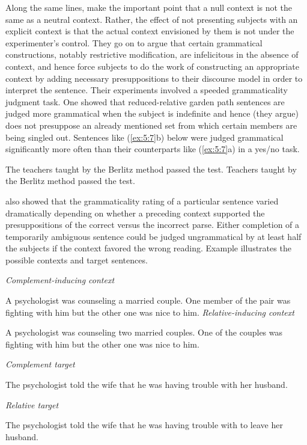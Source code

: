 Along the same lines, \citet{CrainSteedman1985} make the important point that a null context is not the same as a neutral context. Rather, the effect of not presenting subjects with an explicit context is that the actual context envisioned by them is not under the experimenter's control. They go on to argue that certain grammatical constructions, notably restrictive modification, are infelicitous in the
absence of context, and hence force subjects to do the work of constructing an appropriate context by adding necessary presuppositions to their discourse model in order to interpret the sentence. Their experiments involved a speeded grammaticality judgment task. One showed that reduced-relative garden path sentences are judged more grammatical when the subject is indefinite and hence (they argue) does not presuppose an already mentioned set from which certain members are being singled out. Sentences like (\ref{ex:5:7}b) below were judged grammatical significantly more often than their counterparts like (\ref{ex:5:7}a) in a yes/no task.

\ea\label{ex:5:7}
\ea The teachers taught by the Berlitz method passed the test.
\ex  Teachers taught by the Berlitz method passed the test.
\z
\z

\noindent
\citeauthor{CrainSteedman1985} also showed that the grammaticality rating of a particular sentence varied dramatically depending on whether a preceding context supported the presuppositions of the correct versus the incorrect parse. Either completion of a temporarily ambiguous sentence could be judged ungrammatical by at least half the subjects if the context favored the wrong reading. Example  illustrates the possible contexts and target sentences.

\ea\label{ex:5:8}
\ea       \textit{Complement-inducing  context}

A psychologist was counseling a married couple. One member of the pair was fighting with him but the other one was nice to him.
\ex  \textit{Relative-inducing  context}

A psychologist was counseling two married couples. One of the couples was fighting with him but the other one was nice to him.

\ex  \textit{Complement  target}

The psychologist told the wife that he was having trouble with her husband.

\ex \textit{Relative target}

The psychologist told the wife that he was having trouble with to leave her husband.
\z
\z


